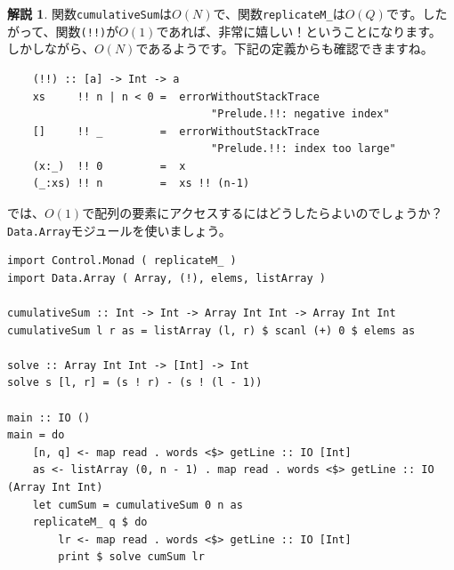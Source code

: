 \documentclass[12pt,a4paper,dvipdfmx,fleqn]{article}%
\theoremstyle{definition}
\newtheorem*{toi*}{問題}
\theoremstyle{definition}
\newtheorem*{ans*}{解説}
\theoremstyle{definition}
\begin{document}
\begin{ans*}
    関数\texttt{cumulativeSum}は$O(N)$で、関数\texttt{replicateM\_}は$O(Q)$です。したがって、関数\texttt{(!!)}が$O(1)$であれば、非常に嬉しい！ということになります。
    しかしながら、$O(N)$であるようです。下記の定義からも確認できますね。
    \begin{verbatim}
    (!!) :: [a] -> Int -> a
    xs     !! n | n < 0 =  errorWithoutStackTrace 
                                "Prelude.!!: negative index"
    []     !! _         =  errorWithoutStackTrace 
                                "Prelude.!!: index too large"
    (x:_)  !! 0         =  x
    (_:xs) !! n         =  xs !! (n-1)
    \end{verbatim}
    \vspace*{-4mm}
    では、$O(1)$で配列の要素にアクセスするにはどうしたらよいのでしょうか？ \texttt{Data.Array}モジュールを使いましょう。
\end{ans*}
\begin{lstlisting}[caption=A06\_01.hs,label=A06_01]
import Control.Monad ( replicateM_ )
import Data.Array ( Array, (!), elems, listArray )

cumulativeSum :: Int -> Int -> Array Int Int -> Array Int Int
cumulativeSum l r as = listArray (l, r) $ scanl (+) 0 $ elems as

solve :: Array Int Int -> [Int] -> Int
solve s [l, r] = (s ! r) - (s ! (l - 1))

main :: IO ()
main = do
    [n, q] <- map read . words <$> getLine :: IO [Int]
    as <- listArray (0, n - 1) . map read . words <$> getLine :: IO (Array Int Int)
    let cumSum = cumulativeSum 0 n as
    replicateM_ q $ do
        lr <- map read . words <$> getLine :: IO [Int]
        print $ solve cumSum lr
\end{lstlisting}

\end{document}
